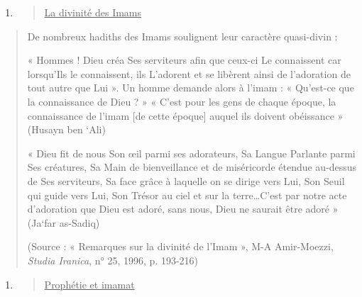\begin{enumerate}
\def\labelenumi{\arabic{enumi}.}
\setcounter{enumi}{1}
\item
  \begin{quote}
  \underline{La divinité des Imams}
  \end{quote}
\end{enumerate}

\begin{quote}
De nombreux hadiths des Imams soulignent leur caractère quasi-divin :

« Hommes ! Dieu créa Ses serviteurs afin que ceux-ci Le connaissent car
lorsqu'Ils le connaissent, ils L'adorent et se libèrent ainsi de
l'adoration de tout autre que Lui ». Un homme demande alors à l'imam : «
Qu'est-ce que la connaissance de Dieu ? » « C'est pour les gens de
chaque époque, la connaissance de l'imam {[}de cette époque{]} auquel
ils doivent obéissance » (Husayn ben `Ali)

« Dieu fit de nous Son œil parmi ses adorateurs, Sa Langue Parlante
parmi Ses créatures, Sa Main de bienveillance et de miséricorde étendue
au-dessus de Ses serviteurs, Sa face grâce à laquelle on se dirige vers
Lui, Son Seuil qui guide vers Lui, Son Trésor au ciel et sur la
terre\ldots C'est par notre acte d'adoration que Dieu est adoré, sans
nous, Dieu ne saurait être adoré » (Ja`far as-Sadiq)

(Source : « Remarques sur la divinité de l'Imam », M-A Amir-Moezzi,
\emph{Studia Iranica}, n° 25, 1996, p. 193-216)
\end{quote}

\begin{enumerate}
\def\labelenumi{\arabic{enumi}.}
\setcounter{enumi}{2}
\item
  \begin{quote}
  \underline{Prophétie et imamat}
  \end{quote}
\end{enumerate}

